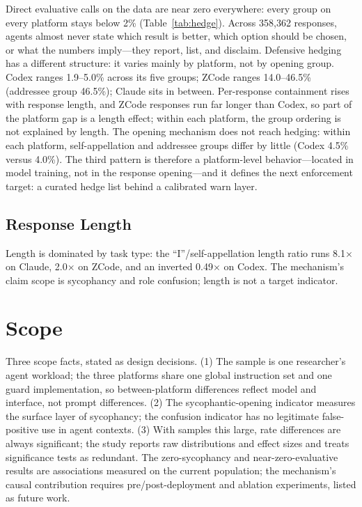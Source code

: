 \documentclass[10pt,twocolumn]{article}
\begin{document}
Direct evaluative calls on the data are near zero everywhere: every group on every
platform stays below 2\% (Table~\ref{tab:hedge}). Across 358{,}362 responses, agents
almost never state which result is better, which option should be chosen, or what the
numbers imply---they report, list, and disclaim. Defensive hedging has a different
structure: it varies mainly by platform, not by opening group. Codex ranges 1.9--5.0\%
across its five groups; ZCode ranges 14.0--46.5\% (addressee group 46.5\%); Claude sits
in between. Per-response containment rises with response length, and ZCode responses
run far longer than Codex, so part of the platform gap is a length effect; within each
platform, the group ordering is not explained by length. The opening mechanism does not
reach hedging: within each platform, self-appellation and addressee groups differ by
little (Codex 4.5\% versus 4.0\%). The third pattern is therefore a platform-level
behavior---located in model training, not in the response opening---and it defines the
next enforcement target: a curated hedge list behind a calibrated warn layer.

\subsection{Response Length}
Length is dominated by task type: the ``I''/self-appellation length ratio runs
8.1$\times$ on Claude, 2.0$\times$ on ZCode, and an inverted 0.49$\times$ on Codex.
The mechanism's claim scope is sycophancy and role confusion; length is not a target
indicator.

\section{Scope}
Three scope facts, stated as design decisions. (1) The sample is one researcher's agent
workload; the three platforms share one global instruction set and one guard
implementation, so between-platform differences reflect model and interface, not prompt
differences. (2) The sycophantic-opening indicator measures the surface layer of
sycophancy; the confusion indicator has no legitimate false-positive use in agent
contexts. (3) With samples this large, rate differences are always significant; the
study reports raw distributions and effect sizes and treats significance tests as
redundant. The zero-sycophancy and near-zero-evaluative results are associations
measured on the current population; the mechanism's causal contribution requires
pre/post-deployment and ablation experiments, listed as future work.
\end{document}
